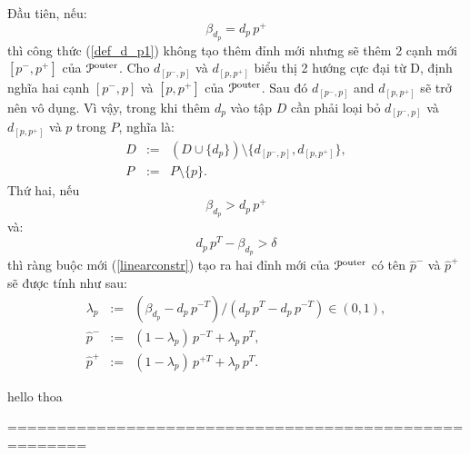 \documentclass[12pt,a4paper,openany,oneside]{report}
\begin{document}
Đầu tiên, nếu:
\begin{equation}\label{betaequal}
	\beta_{d_p} = d_p\, p^+
\end{equation}
thì công thức (\ref{def_d_p1}) không tạo thêm đỉnh mới nhưng sẽ thêm 2 cạnh mới  $[p^-, p^+]$ của ${\cal P}^{\rm outer}$. Cho  $d_{[p^-, p]}$ và $d_{[p, p^+]}$ biểu thị 2 hướng cực đại từ D, định nghĩa hai cạnh $[p^-, p]$ và $[ p, p^+]$ của ${\cal P}^{\rm outer}$. Sau đó $d_{[p^-, p]}$ and $d_{[p, p^+]}$ sẽ trở nên vô dụng. Vì vậy, trong khi thêm $d_p$ vào tập $D$ cần phải loại bỏ $d_{[p^-, p]}$ và $d_{[p, p^+]}$ và $p$ trong $P$, nghĩa là:
\begin{equation}\label{newDP2}
	\begin{array}{lcl}
		D &:=& (D \cup \{d_{p}\})\setminus \{d_{[p^-,p]}, d_{[p,p^+]}\}, \\
		P &:=& P \setminus \{p\}.
	\end{array}
\end{equation}
Thứ hai, nếu
\begin{equation}\label{betagreater}
	\beta_{d_p} > d_p\, p^+
\end{equation}
và:
\begin{equation}\label{greaterdelta}
	d_{p}\, p^T - \beta_{d_{p}} > \delta
\end{equation}
thì ràng buộc mới (\ref{linearconstr}) tạo ra hai đỉnh mới của ${\cal P}^{\rm outer}$ có tên $\hat p^-$ và $\hat p^+$ sẽ được tính như sau:
\begin{equation}\label{def_hatp}
	\begin{array}{lcl}
		\lambda_p &:=& (\beta_{d_p} - d_p\, p^{-T})/(d_p\, p^T - d_p\, p^{-T}) \in (0, 1), \\
		\hat p^- &:=& (1 - \lambda_p)\, p^{-T} + \lambda_p\, p^T, \\
		\hat p^+ &:=& (1 - \lambda_p)\, p^{+T} + \lambda_p\, p^T.
	\end{array}
\end{equation}












hello thoa



======================================================
\end{document}
